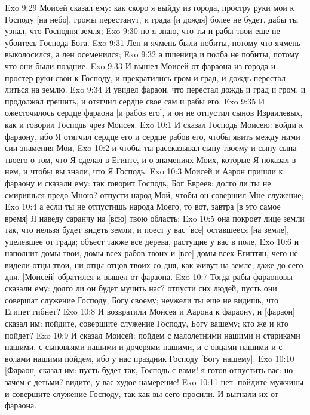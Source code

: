 \vs Exo 9:29 Моисей сказал ему: как скоро я выйду из города, простру руки мои к Господу [на небо], громы перестанут, и града [и дождя] более не будет, дабы ты узнал, что Господня земля;
\vs Exo 9:30 но я знаю, что ты и рабы твои еще не убоитесь Господа Бога.
\vs Exo 9:31 Лен и ячмень были побиты, потому что ячмень выколосился, а лен осеменился;
\vs Exo 9:32 а пшеница и полба не побиты, потому что они были поздние.
\vs Exo 9:33 И вышел Моисей от фараона из города и простер руки свои к Господу, и прекратились гром и град, и дождь перестал литься на землю.
\vs Exo 9:34 И увидел фараон, что перестал дождь и град и гром, и продолжал грешить, и отягчил сердце свое сам и рабы его.
\vs Exo 9:35 И ожесточилось сердце фараона [и рабов его], и он не отпустил сынов Израилевых, как и говорил Господь чрез Моисея.
\vs Exo 10:1 И сказал Господь Моисею: войди к фараону, ибо Я отягчил сердце его и сердце рабов его, чтобы явить между ними сии знамения Мои,
\vs Exo 10:2 и чтобы ты рассказывал сыну твоему и сыну сына твоего о том, что Я сделал в Египте, и о знамениях Моих, которые Я показал в нем, и чтобы вы знали, что Я Господь.
\vs Exo 10:3 Моисей и Аарон пришли к фараону и сказали ему: так говорит Господь, Бог Евреев: долго ли ты не смиришься предо Мною? отпусти народ Мой, чтобы он совершил Мне служение;
\vs Exo 10:4 а если ты не отпустишь народа Моего, то вот, завтра [в это самое время] Я наведу саранчу на [всю] твою область:
\vs Exo 10:5 она покроет лице земли так, что нельзя будет видеть земли, и поест у вас [все] оставшееся [на земле], уцелевшее от града; объест также все дерева, растущие у вас в поле,
\vs Exo 10:6 и наполнит домы твои, домы всех рабов твоих и [все] домы всех Египтян, чего не видели отцы твои, ни отцы отцов твоих со дня, как живут на земле, даже до сего дня. [Моисей] обратился и вышел от фараона.
\vs Exo 10:7 Тогда рабы фараоновы сказали ему: долго ли он будет мучить нас? отпусти сих людей, пусть они совершат служение Господу, Богу своему; неужели ты еще не видишь, что Египет гибнет?
\vs Exo 10:8 И возвратили Моисея и Аарона к фараону, и [фараон] сказал им: пойдите, совершите служение Господу, Богу вашему; кто же и кто пойдет?
\vs Exo 10:9 И сказал Моисей: пойдем с малолетними нашими и стариками нашими, с сыновьями нашими и дочерями нашими, и с овцами нашими и с волами нашими пойдем, ибо у нас праздник Господу [Богу нашему].
\vs Exo 10:10 [Фараон] сказал им: пусть будет так, Господь с вами! я готов отпустить вас: но зачем с детьми? видите, у вас худое намерение!
\vs Exo 10:11 нет: пойдите  мужчины и совершите служение Господу, так как вы сего просили. И выгнали их от фараона.
